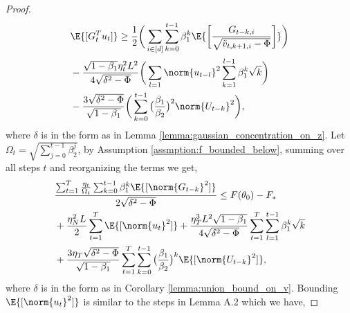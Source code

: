 \documentclass[letterpaper]{article} %
\begin{document}
\begin{proof}
    \begin{align*}
        &\E{[G_t^T u_t]} \geq \frac{1}{2}\bigg( \sum_{i \in [d]} \sum_{k=0}^{t-1} \beta_1^k \E{\bigg[ \frac{G_{t-k,i}}{\sqrt{\Tilde{v}_{t,k+1,i}-\Phi}}\bigg]} \bigg) \\ &- \frac{\sqrt{1-\beta_1}\eta_t^2L^2}{4\sqrt{\delta^2 - \Phi}}\bigg( \sum_{l=1}\norm{u_{t-l}}^2\sum_{k=1}^{l-1}\beta_1^k\sqrt{k} \bigg) \\&- \frac{3\sqrt{\delta^2 - \Phi}}{\sqrt{1-\beta_1}} \bigg( \sum_{k=0}^{t-1} \big(\frac{\beta_1}{\beta_2} \big)^2 \norm{U_{t-k}}^2\bigg),
    \end{align*}
    where $\delta$ is in the form as in Lemma \ref{lemma:gaussian_concentration_on_z}.
    Let $\Omega_t=\sqrt{\sum_{j=0}^{t-1}\beta_2^{j}}$, by Assumption \ref{assmption:f_bounded_below}, summing over all steps $t$ and reorganizing the terms we get,
    \begin{align*}
        &\frac{\sum_{t=1}^{T}\frac{\eta_t}{\Omega_t} \sum_{k=0}^{t-1}\beta_1^k \E{[\norm{G_{t-k}}^2]}}{2\sqrt{\delta^2 - \Phi}} \leq F(\theta_0) - F_{*} \\&+ \frac{\eta_N^2L}{2}\sum_{t=1}^{T} \E{[\norm{u_t}^2]} + \frac{\eta_{T}^3L^2\sqrt{1-\beta_1}}{4\sqrt{\delta^2 - \Phi}}\sum_{t=1}^{T} \sum_{l=1}^{t-1} \beta_1^k\sqrt{k} \\
        &+ \frac{3\eta_{T}\sqrt{\delta^2 - \Phi}}{\sqrt{1-\beta_1}}\sum_{t=1}^{T}\sum_{k=0}^{t-1}\big(\frac{\beta_1}{\beta_2}\big)^k \E{[\norm{U_{t-k}}^2]},
    \end{align*}
    where $\delta$ is in the form as in Corollary \ref{lemma:union_bound_on_v}.
    Bounding $\E{[\norm{u_t}^2]}$ is similar to the steps in Lemma A.2 \citep{défossez2022simple} which we have,

\end{proof}
\end{document}

